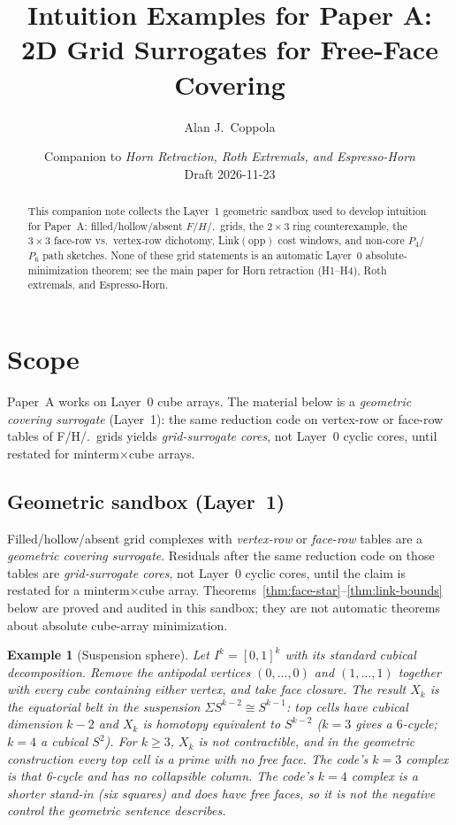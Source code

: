 \documentclass[11pt]{article}
\title{Intuition Examples for Paper A:\\
2D Grid Surrogates for Free-Face Covering}
\author{Alan J.\ Coppola}
\date{Companion to \emph{Horn Retraction, Roth Extremals, and Espresso-Horn}\\Draft 2026-11-23}
\newtheorem{example}[theorem]{Example}
\begin{document}
\maketitle

\begin{abstract}
This companion note collects the Layer~1 geometric sandbox used to develop
intuition for Paper~A: filled/hollow/absent $F/H/.$\ grids, the $2\times 3$ ring
counterexample, the $3\times 3$ face-row vs.\ vertex-row dichotomy,
Link$(\mathrm{opp})$ cost windows, and non-core $P_4$/$P_6$ path sketches.
None of these grid statements is an automatic Layer~0 absolute-minimization theorem;
see the main paper for Horn retraction (H1--H4), Roth extremals, and Espresso-Horn.
\end{abstract}

\section{Scope}
\label{sec:scope}
Paper~A works on Layer~0 cube arrays.  The material below is a
\emph{geometric covering surrogate} (Layer~1): the same reduction code on
vertex-row or face-row tables of F/H/.\ grids yields \emph{grid-surrogate cores},
not Layer~0 cyclic cores, until restated for minterm$\times$cube arrays.

\subsection{Geometric sandbox (Layer~1)}
\label{sec:sandbox}

Filled/hollow/absent grid complexes with \emph{vertex-row} or \emph{face-row}
tables are a \emph{geometric covering surrogate}.  Residuals after the same
reduction code on those tables are \emph{grid-surrogate cores}, not Layer~0
cyclic cores, until the claim is restated for a minterm$\times$cube array.
Theorems~\ref{thm:face-star}--\ref{thm:link-bounds} below are proved and audited
in this sandbox; they are not automatic theorems about absolute cube-array
minimization.

\begin{example}[Suspension sphere]
\label{ex:suspension}
Let $I^k=[0,1]^k$ with its standard cubical decomposition.  Remove the
antipodal vertices $(0,\ldots,0)$ and $(1,\ldots,1)$ together with every cube
containing either vertex, and take face closure.  The result $X_k$ is the
equatorial belt in the suspension $\Sigma S^{k-2}\cong S^{k-1}$: top cells have
cubical dimension $k-2$ and $X_k$ is homotopy equivalent to $S^{k-2}$ ($k=3$
gives a $6$-cycle; $k=4$ a cubical $S^2$).  For $k\ge 3$, $X_k$ is
\emph{not} contractible, and in the geometric construction every top cell is a
prime with no free face.  The code's $k=3$ complex is that 6-cycle and has no
collapsible column.  The code's $k=4$ complex is a shorter stand-in (six
squares) and \emph{does} have free faces, so it is not the negative control
the geometric sentence describes.
\end{example}
\end{document}
